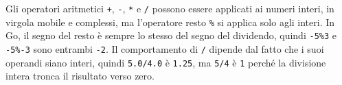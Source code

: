 \documentclass[../../thesis.tex]{subfiles}
\begin{document}
    Gli operatori aritmetici \verb"+", \verb"-", \verb"*" e \verb"/" possono essere applicati ai numeri interi, in virgola mobile e complessi, ma l'operatore resto \verb"%" si applica solo agli interi.
    In Go, il segno del resto è sempre lo stesso del segno del dividendo, quindi \verb"-5%3" e \verb"-5%-3" sono entrambi \verb"-2".
    Il comportamento di \verb"/" dipende dal fatto che i suoi operandi siano interi, quindi \verb"5.0/4.0" è \verb"1.25", ma \verb"5/4" è \verb"1" perché la divisione intera tronca il risultato verso zero.
\end{document}
